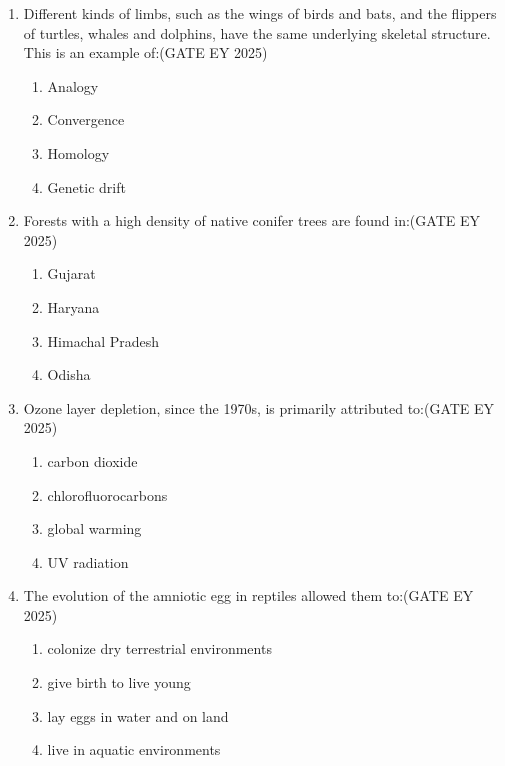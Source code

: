 \begin{enumerate}[leftmargin=*,label=\textbf{Q.\arabic*}]

\item Different kinds of limbs, such as the wings of birds and bats, and the flippers of turtles, whales and dolphins, have the same underlying skeletal structure. This is an example of:\hfill {(GATE EY 2025)}
\begin{multicols}{2}
\begin{enumerate}
\item Analogy
\item Convergence
\item Homology
\item Genetic drift
\end{enumerate}
\end{multicols}

\item Forests with a high density of native conifer trees are found in:\hfill {(GATE EY 2025)}
\begin{multicols}{2}
\begin{enumerate}
\item Gujarat
\item Haryana
\item Himachal Pradesh
\item Odisha
\end{enumerate}
\end{multicols}

\item Ozone layer depletion, since the 1970s, is primarily attributed to:\hfill {(GATE EY 2025)}
\begin{multicols}{2}
\begin{enumerate}
\item carbon dioxide
\item chlorofluorocarbons
\item global warming
\item UV radiation
\end{enumerate}
\end{multicols}

\item The evolution of the amniotic egg in reptiles allowed them to:\hfill {(GATE EY 2025)}
\begin{multicols}{2}
\begin{enumerate}
\item colonize dry terrestrial environments
\item give birth to live young
\item lay eggs in water and on land
\item live in aquatic environments
\end{enumerate}
\end{multicols}


\end{enumerate}

